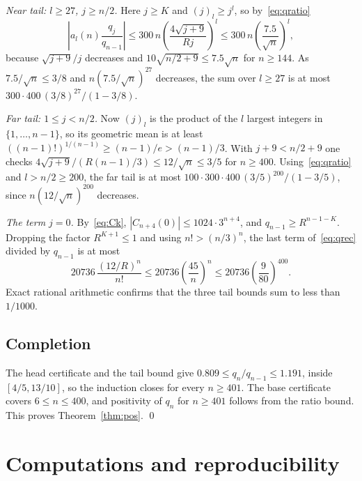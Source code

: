 \documentclass[11pt,a4paper]{article}
\theoremstyle{remark}
\begin{document}
\emph{Near tail: $l\ge27$, $j\ge n/2$.} Here $j\ge K$ and $(j)_l\ge j^l$, so by~\eqref{eq:qratio}
\[
  \left|a_l(n)\frac{q_j}{q_{n-1}}\right|\le300\,n\left(\frac{4\sqrt{j+9}}{Rj}\right)^l\le300\,n\left(\frac{7.5}{\sqrt n}\right)^l,
\]
because $\sqrt{j+9}/j$ decreases and $10\sqrt{n/2+9}\le7.5\sqrt n$ for $n\ge144$. As $7.5/\sqrt n\le3/8$ and $n(7.5/\sqrt n)^{27}$ decreases, the sum over $l\ge27$ is at most $300\cdot400\,(3/8)^{27}/(1-3/8)$.

\emph{Far tail: $1\le j<n/2$.} Now $(j)_l$ is the product of the $l$ largest integers in $\{1,\dots,n-1\}$, so its geometric mean is at least $((n-1)!)^{1/(n-1)}\ge(n-1)/e>(n-1)/3$. With $j+9<n/2+9$ one checks $4\sqrt{j+9}/(R(n-1)/3)\le12/\sqrt n\le3/5$ for $n\ge400$. Using~\eqref{eq:qratio} and $l>n/2\ge200$, the far tail is at most $100\cdot300\cdot400\,(3/5)^{200}/(1-3/5)$, since $n(12/\sqrt n)^{200}$ decreases.

\emph{The term $j=0$.} By~\eqref{eq:Ck}, $|C_{n+4}(0)|\le1024\cdot3^{n+4}$, and $q_{n-1}\ge R^{n-1-K}$. Dropping the factor $R^{K+1}\le1$ and using $n!>(n/3)^n$, the last term of~\eqref{eq:qrec} divided by $q_{n-1}$ is at most
\[
  20736\,\frac{(12/R)^n}{n!}\le20736\left(\frac{45}n\right)^n\le20736\left(\frac9{80}\right)^{400}.
\]
Exact rational arithmetic confirms that the three tail bounds sum to less than $1/1000$.

\subsection{Completion}

The head certificate and the tail bound give $0.809\le q_n/q_{n-1}\le1.191$, inside $[4/5,13/10]$, so the induction closes for every $n\ge401$. The base certificate covers $6\le n\le400$, and positivity of $q_n$ for $n\ge401$ follows from the ratio bound. This proves Theorem~\ref{thm:pos}. \qed

\section{Computations and reproducibility}\label{sec:numerics}
\end{document}
